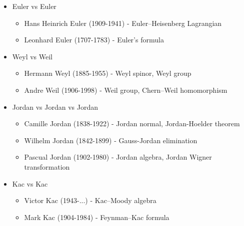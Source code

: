 \documentclass[10pt,a4paper]{book}
\theoremstyle{definition}
\begin{document}
\begin{itemize}
\item Euler vs Euler
    \begin{itemize}
    \item {\sc Hans Heinrich Euler} (1909-1941) - Euler–Heisenberg Lagrangian
    \item {\sc Leonhard Euler} (1707-1783) - Euler's formula
    \end{itemize}
\item Weyl vs Weil
    \begin{itemize}
    \item {\sc Hermann Weyl} (1885-1955) - Weyl spinor, Weyl group
    \item {\sc Andre Weil} (1906-1998) - Weil group, Chern–Weil homomorphism
    \end{itemize}
\item Jordan vs Jordan vs Jordan
    \begin{itemize}
    \item {\sc Camille Jordan} (1838-1922) - Jordan normal, Jordan-Hoelder theorem
    \item {\sc Wilhelm Jordan} (1842-1899) - Gauss-Jordan elimination
    \item {\sc Pascual Jordan} (1902-1980) - Jordan algebra, Jordan Wigner transformation
    \end{itemize}
\item Kac vs Kac
    \begin{itemize}
    \item {\sc Victor Kac} (1943-...) - Kac–Moody algebra
    \item {\sc Mark Kac} (1904-1984) - Feynman–Kac formula
    \end{itemize}
\end{itemize}
\end{document}
